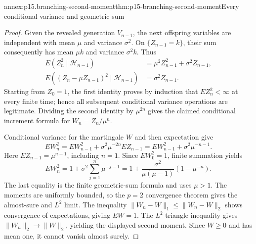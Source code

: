 \begin{annexitem}{annex:p15.branching-second-moment}{thm:p15-branching-second-moment}{Every conditional variance and geometric sum}
\begin{proof}
Given the revealed generation \(V_{n-1}\), the next offspring
variables are independent with mean \(\mu\) and variance \(\sigma^2\).
On \(\{Z_{n-1}=k\}\), their sum consequently has mean \(\mu k\)
and variance \(\sigma^2k\). Thus
\[
 \begin{split}
 E(Z_n^2\mid\mathcal H_{n-1})
                   &=\mu^2Z_{n-1}^2+\sigma^2Z_{n-1},\\
 E((Z_n-\mu Z_{n-1})^2\mid\mathcal H_{n-1})
                   &=\sigma^2Z_{n-1}.
 \end{split}
\]
Starting from \(Z_0=1\), the first identity proves by induction
that \(EZ_n^2<\infty\) at every finite time; hence all subsequent
conditional variance operations are legitimate.
Dividing the second identity by \(\mu^{2n}\) gives the claimed
conditional increment formula for \(W_n=Z_n/\mu^n\).

Conditional variance for the martingale \(W\) and then expectation give
\[
          EW_n^2=EW_{n-1}^2+\sigma^2\mu^{-2n}EZ_{n-1}
                     =EW_{n-1}^2+\sigma^2\mu^{-n-1}.
\]
Here \(EZ_{n-1}=\mu^{n-1}\), including \(n=1\).
Since \(EW_0^2=1\), finite summation yields
\[
       EW_n^2=1+\sigma^2\sum_{j=1}^n\mu^{-j-1}
                  =1+\frac{\sigma^2}{\mu(\mu-1)}(1-\mu^{-n}).
\]
The last equality is the finite geometric-sum formula and uses
\(\mu>1\).
The moments are uniformly bounded, so the \(p=2\) convergence
theorem gives the almost-sure and \(L^2\) limit.
The inequality \(\|W_n-W\|_1\leq\|W_n-W\|_2\)
shows convergence of expectations, giving \(EW=1\).
The \(L^2\) triangle inequality gives
\(\|W_n\|_2\to\|W\|_2\), yielding the displayed second moment.
Since \(W\geq0\) and has mean one, it cannot vanish almost surely.
\end{proof}
\end{annexitem}

